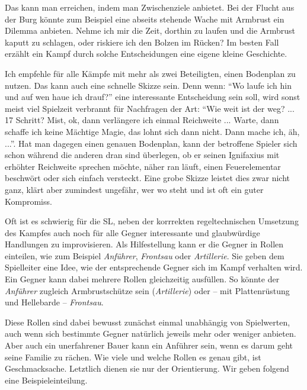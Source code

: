 Das kann man erreichen, indem man Zwischenziele anbietet.
Bei der Flucht aus der Burg könnte zum Beispiel eine abseits stehende Wache mit Armbrust ein Dilemma anbieten.
Nehme ich mir die Zeit, dorthin zu laufen und die Armbrust kaputt zu schlagen, oder riskiere ich den Bolzen im Rücken?
Im besten Fall erzählt ein Kampf durch solche Entscheidungen eine eigene kleine Geschichte.

Ich empfehle für alle Kämpfe mit mehr als zwei Beteiligten, einen Bodenplan zu nutzen.
Das kann auch eine schnelle Skizze sein.
Denn wenn: \enquote{Wo laufe ich hin und auf wen haue ich drauf?} eine interessante Entscheidung sein soll, wird sonst meist viel Spielzeit verbrannt für Nachfragen der Art: \enquote{Wie weit ist der weg? ... 17 Schritt? Mist, ok, dann verlängere ich einmal Reichweite ... Warte, dann schaffe ich keine Mächtige Magie, das lohnt sich dann nicht. Dann mache ich, äh, ...}.
Hat man dagegen einen genauen Bodenplan, kann der betroffene Spieler sich schon während die anderen dran sind überlegen, ob er seinen Ignifaxius mit erhöhter Reichweite sprechen möchte, näher ran läuft, einen Feuerelementar beschwört oder sich einfach versteckt. Eine grobe Skizze leistet dies zwar nicht ganz, klärt aber zumindest ungefähr, wer wo steht und ist oft ein guter Kompromiss.

\vfill


\neueseite

Oft ist es schwierig für die SL, neben der korrrekten regeltechnischen Umsetzung des Kampfes auch noch für alle Gegner interessante und glaubwürdige Handlungen zu improvisieren.
Als Hilfestellung kann er die Gegner in Rollen einteilen, wie zum Beispiel \textit{Anführer}, \textit{Frontsau} oder \textit{Artillerie}.
Sie geben dem Spielleiter eine Idee, wie der entsprechende Gegner sich im Kampf verhalten wird.
Ein Gegner kann dabei mehrere Rollen gleichzeitig ausfüllen. So könnte der \textit{Anführer} zugleich Armbrustschütze sein (\textit{Artillerie})
oder -- mit Plattenrüstung und Hellebarde -- \textit{Frontsau}. 

Diese Rollen sind dabei bewusst zunächst einmal unabhängig von Spielwerten, auch wenn sich bestimmte Gegner natürlich jeweils mehr oder weniger anbieten.
Aber auch ein unerfahrener Bauer kann ein Anführer sein, wenn es darum geht seine Familie zu rächen.
Wie viele und welche Rollen es genau gibt, ist Geschmacksache.
Letztlich dienen sie nur der Orientierung.
Wir geben folgend eine Beispieleinteilung.

